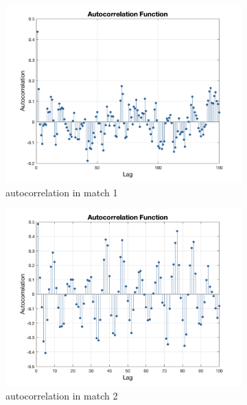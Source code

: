 \begin{figure}[H]
    \centering
    \begin{subfigure}[b]{0.34\textwidth}
        \includegraphics[width=\linewidth]{mainmatter/imgs/momen_selfco_1.png}
        \caption{autocorrelation in match 1}
    \end{subfigure}\hspace{-0.02\textwidth}
    \begin{subfigure}[b]{0.34\textwidth}
        \includegraphics[width=\linewidth]{mainmatter/imgs/momen_selfco_2.png}
        \caption{autocorrelation in match 2}
    \end{subfigure}\hspace{-0.02\textwidth}
    \begin{subfigure}[b]{0.34\textwidth}

\end{subfigure}
\end{figure}
